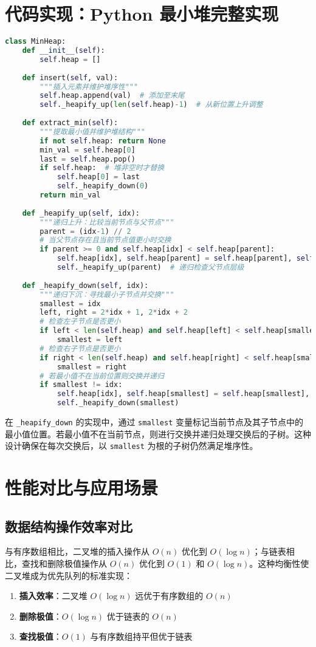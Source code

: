 \chapter{代码实现：Python 最小堆完整实现}
\begin{lstlisting}[language=python]
class MinHeap:
    def __init__(self):
        self.heap = []
    
    def insert(self, val):
        """插入元素并维护堆序性"""
        self.heap.append(val)  # 添加至末尾
        self._heapify_up(len(self.heap)-1)  # 从新位置上升调整
        
    def extract_min(self):
        """提取最小值并维护堆结构"""
        if not self.heap: return None
        min_val = self.heap[0]
        last = self.heap.pop()
        if self.heap:  # 堆非空时才替换
            self.heap[0] = last
            self._heapify_down(0)
        return min_val
    
    def _heapify_up(self, idx):
        """递归上升：比较当前节点与父节点"""
        parent = (idx-1) // 2
        # 当父节点存在且当前节点值更小时交换
        if parent >= 0 and self.heap[idx] < self.heap[parent]:
            self.heap[idx], self.heap[parent] = self.heap[parent], self.heap[idx]
            self._heapify_up(parent)  # 递归检查父节点层级
    
    def _heapify_down(self, idx):
        """递归下沉：寻找最小子节点并交换"""
        smallest = idx
        left, right = 2*idx + 1, 2*idx + 2
        # 检查左子节点是否更小
        if left < len(self.heap) and self.heap[left] < self.heap[smallest]:
            smallest = left
        # 检查右子节点是否更小
        if right < len(self.heap) and self.heap[right] < self.heap[smallest]:
            smallest = right
        # 若最小值不在当前位置则交换并递归
        if smallest != idx:
            self.heap[idx], self.heap[smallest] = self.heap[smallest], self.heap[idx]
            self._heapify_down(smallest)
\end{lstlisting}
在 \texttt{\_{}heapify\_{}down} 的实现中，通过 \texttt{smallest} 变量标记当前节点及其子节点中的最小值位置。若最小值不在当前节点，则进行交换并递归处理交换后的子树。这种设计确保在每次交换后，以 \texttt{smallest} 为根的子树仍然满足堆序性。\par
\chapter{性能对比与应用场景}
\section{数据结构操作效率对比}
与有序数组相比，二叉堆的插入操作从 $O(n)$ 优化到 $O(\log n)$；与链表相比，查找和删除极值操作从 $O(n)$ 优化到 $O(1)$ 和 $O(\log n)$。这种均衡性使二叉堆成为优先队列的标准实现：\par
\begin{enumerate}
\item \textbf{插入效率}：二叉堆 $O(\log n)$ 远优于有序数组的 $O(n)$
\item \textbf{删除极值}：$O(\log n)$ 优于链表的 $O(n)$
\item \textbf{查找极值}：$O(1)$ 与有序数组持平但优于链表
\end{enumerate}
